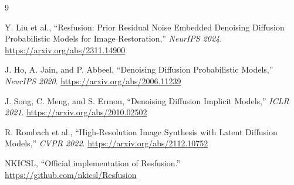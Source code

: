 \documentclass[11pt,a4paper]{ltjsarticle}
\begin{document}
\begin{thebibliography}{9}

Y. Liu et al.,
\newblock ``Resfusion: Prior Residual Noise Embedded Denoising Diffusion
  Probabilistic Models for Image Restoration,''
\newblock \emph{NeurIPS 2024}.
\newblock \url{https://arxiv.org/abs/2311.14900}

J. Ho, A. Jain, and P. Abbeel,
\newblock ``Denoising Diffusion Probabilistic Models,''
\newblock \emph{NeurIPS 2020}.
\newblock \url{https://arxiv.org/abs/2006.11239}

J. Song, C. Meng, and S. Ermon,
\newblock ``Denoising Diffusion Implicit Models,''
\newblock \emph{ICLR 2021}.
\newblock \url{https://arxiv.org/abs/2010.02502}

R. Rombach et al.,
\newblock ``High-Resolution Image Synthesis with Latent Diffusion Models,''
\newblock \emph{CVPR 2022}.
\newblock \url{https://arxiv.org/abs/2112.10752}

NKICSL,
\newblock ``Official implementation of Resfusion.''
\newblock \url{https://github.com/nkicsl/Resfusion}

\end{thebibliography}
\end{document}
